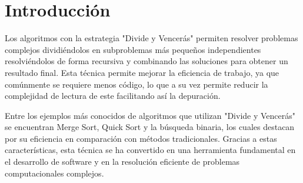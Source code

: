\chapter{Introducción}

Los algoritmos con la estrategia "Divide y Vencerás" permiten resolver problemas complejos dividiéndolos en subproblemas más pequeños independientes resolviéndolos de forma recursiva y combinando las soluciones para obtener un resultado final.
Esta técnica permite mejorar la eficiencia de trabajo, ya que comúnmente se requiere menos código, lo que a su vez permite reducir la complejidad de lectura de este facilitando así la depuración.

Entre los ejemplos más conocidos de algoritmos que utilizan "Divide y Vencerás" se encuentran Merge Sort, Quick Sort y la búsqueda binaria, los cuales destacan por su eficiencia en comparación con métodos tradicionales. 
Gracias a estas características, esta técnica se ha convertido en una herramienta fundamental en el desarrollo de software y en la resolución eficiente de problemas computacionales complejos.